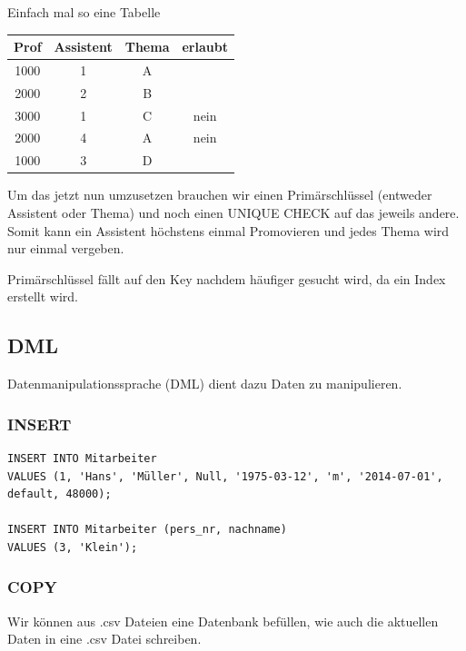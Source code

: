 \documentclass[a4paper]{article}
\begin{document}
Einfach mal so eine Tabelle

\begin{center}
    \begin{tabular}{c|c|c|c}
        Prof & Assistent & Thema & erlaubt\\
        \hline
        1000 & 1 & A & \\
        2000 & 2 & B & \\
        3000 & 1 & C & nein\\
        2000 & 4 & A & nein\\
        1000 & 3 & D & \\
    \end{tabular}
\end{center}

Um das jetzt nun umzusetzen brauchen wir einen Primärschlüssel (entweder Assistent oder Thema) und noch einen UNIQUE CHECK auf das jeweils andere. Somit kann ein Assistent höchstens einmal Promovieren und jedes Thema wird nur einmal vergeben.

Primärschlüssel fällt auf den Key nachdem häufiger gesucht wird, da ein Index erstellt wird.


\subsection{DML}


Datenmanipulationssprache (DML) dient dazu Daten zu manipulieren.

\subsubsection{INSERT}

\begin{lstlisting}
INSERT INTO Mitarbeiter
VALUES (1, 'Hans', 'Müller', Null, '1975-03-12', 'm', '2014-07-01', default, 48000);

INSERT INTO Mitarbeiter (pers_nr, nachname)
VALUES (3, 'Klein');
\end{lstlisting}

\subsubsection{COPY}

Wir können aus .csv Dateien eine Datenbank befüllen, wie auch die aktuellen Daten in eine .csv Datei schreiben.
\end{document}
